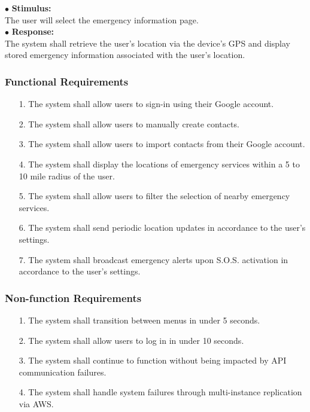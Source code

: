 \documentclass{scrreprt}
\begin{document}
\vspace{5mm}
	\hspace{-4.75mm} $\bullet$ \textbf{Stimulus:} \\ \hspace{5mm} The user will select the emergency information page.\\
	$\bullet$ \textbf{Response:} \\ \hspace{5mm} The system shall retrieve the user's location via the device's GPS and display stored emergency information associated with the user's location.


\subsubsection{Functional Requirements}
\begin{enumerate}
	\item[1.] The system shall allow users to sign-in using their Google account.
	\item[2.] The system shall allow users to manually create contacts.
	\item[3.] The system shall allow users to import contacts from their Google account.
	\item[4.] The system shall display the locations of emergency services within a 5 to 10 mile radius of the user.
	\item[5.] The system shall allow users to filter the selection of nearby emergency services.
	\item[6.] The system shall send periodic location updates in accordance to the user's settings.
	\item[7.] The system shall broadcast emergency alerts upon S.O.S. activation in accordance to the user's settings.
\end{enumerate}


\subsubsection{Non-function Requirements}
\begin{enumerate}
	\item[1.] The system shall transition between menus in under 5 seconds.
	\item[2.] The system shall allow users to log in in under 10 seconds.
	\item[3.] The system shall continue to function without being impacted by API communication failures.
	\item[4.] The system shall handle system failures through multi-instance replication via AWS.
\end{enumerate}
\end{document}
